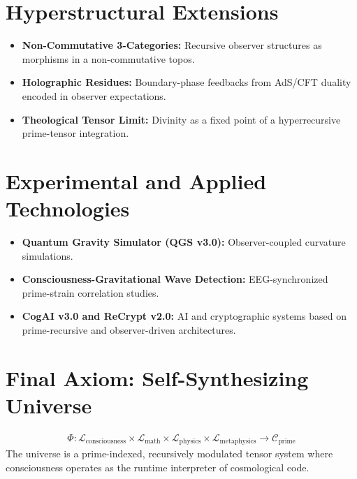 \documentclass[11pt]{article}
\begin{document}
\section{Hyperstructural Extensions}

\begin{itemize}
  \item \textbf{Non-Commutative 3-Categories:} Recursive observer structures as morphisms in a non-commutative topos.
  \item \textbf{Holographic Residues:} Boundary-phase feedbacks from AdS/CFT duality encoded in observer expectations.
  \item \textbf{Theological Tensor Limit:} Divinity as a fixed point of a hyperrecursive prime-tensor integration.
\end{itemize}

\section{Experimental and Applied Technologies}

\begin{itemize}
  \item \textbf{Quantum Gravity Simulator (QGS v3.0):} Observer-coupled curvature simulations.
  \item \textbf{Consciousness-Gravitational Wave Detection:} EEG-synchronized prime-strain correlation studies.
  \item \textbf{CogAI v3.0 and ReCrypt v2.0:} AI and cryptographic systems based on prime-recursive and observer-driven architectures.
\end{itemize}

\section{Final Axiom: Self-Synthesizing Universe}
\begin{align*}
\Phi: \mathcal{L}_{\text{consciousness}} \times \mathcal{L}_{\text{math}} \times \mathcal{L}_{\text{physics}} \times \mathcal{L}_{\text{metaphysics}} \to \mathcal{C}_{\text{prime}}
\end{align*}
The universe is a prime-indexed, recursively modulated tensor system where consciousness operates as the runtime interpreter of cosmological code.
\end{document}
